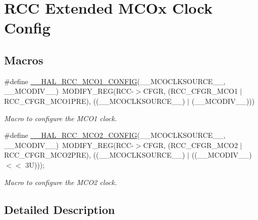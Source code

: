 \hypertarget{group___r_c_c_ex___m_c_ox___clock___config}{}\section{R\+CC Extended M\+C\+Ox Clock Config}
\label{group___r_c_c_ex___m_c_ox___clock___config}
\subsection*{Macros}
\begin{DoxyCompactItemize}
\item 
\#define \hyperlink{group___r_c_c_ex___m_c_ox___clock___config_ga7e5f7f1efc92794b6f0e96068240b45e}{\+\_\+\+\_\+\+H\+A\+L\+\_\+\+R\+C\+C\+\_\+\+M\+C\+O1\+\_\+\+C\+O\+N\+F\+IG}(\+\_\+\+\_\+\+M\+C\+O\+C\+L\+K\+S\+O\+U\+R\+C\+E\+\_\+\+\_\+,  \+\_\+\+\_\+\+M\+C\+O\+D\+I\+V\+\_\+\+\_\+)~M\+O\+D\+I\+F\+Y\+\_\+\+R\+EG(R\+CC-\/$>$C\+F\+GR, (R\+C\+C\+\_\+\+C\+F\+G\+R\+\_\+\+M\+C\+O1 $\vert$ R\+C\+C\+\_\+\+C\+F\+G\+R\+\_\+\+M\+C\+O1\+P\+RE), ((\+\_\+\+\_\+\+M\+C\+O\+C\+L\+K\+S\+O\+U\+R\+C\+E\+\_\+\+\_\+) $\vert$ (\+\_\+\+\_\+\+M\+C\+O\+D\+I\+V\+\_\+\+\_\+)))
\begin{DoxyCompactList}\small\item\em Macro to configure the M\+C\+O1 clock. \end{DoxyCompactList}\item 
\#define \hyperlink{group___r_c_c_ex___m_c_ox___clock___config_gabb7360422910dd65312786fc49722d25}{\+\_\+\+\_\+\+H\+A\+L\+\_\+\+R\+C\+C\+\_\+\+M\+C\+O2\+\_\+\+C\+O\+N\+F\+IG}(\+\_\+\+\_\+\+M\+C\+O\+C\+L\+K\+S\+O\+U\+R\+C\+E\+\_\+\+\_\+,  \+\_\+\+\_\+\+M\+C\+O\+D\+I\+V\+\_\+\+\_\+)~M\+O\+D\+I\+F\+Y\+\_\+\+R\+EG(R\+CC-\/$>$C\+F\+GR, (R\+C\+C\+\_\+\+C\+F\+G\+R\+\_\+\+M\+C\+O2 $\vert$ R\+C\+C\+\_\+\+C\+F\+G\+R\+\_\+\+M\+C\+O2\+P\+RE), ((\+\_\+\+\_\+\+M\+C\+O\+C\+L\+K\+S\+O\+U\+R\+C\+E\+\_\+\+\_\+) $\vert$ ((\+\_\+\+\_\+\+M\+C\+O\+D\+I\+V\+\_\+\+\_\+) $<$$<$ 3\+U)));
\begin{DoxyCompactList}\small\item\em Macro to configure the M\+C\+O2 clock. \end{DoxyCompactList}\end{DoxyCompactItemize}


\subsection{Detailed Description}


